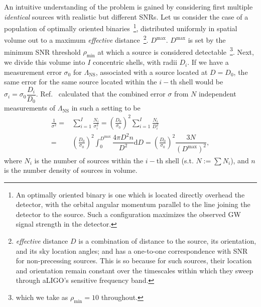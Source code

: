 \documentclass[aps,prd,amsmath,floats,floatfix, twocolumn,
superscriptaddress,nofootinbib,showpacs]{revtex4-1}
\newcommand{\prayush}{\textcolor{red!40!black}}
\newcommand{\D}{\mathrm{d}}
\newcommand{\lambdans}{\Lambda_\mathrm{NS}}
\newcommand{\deff}{D_\mathrm{eff}}
\begin{document}
% 
An intuitive understanding of the problem is gained by considering first
multiple {\it identical} sources with realistic but different SNRs. Let us consider the case
of a population of optimally oriented binaries~\footnote{An optimally oriented
binary is one which is located directly overhead the detector, with the 
orbital angular momentum parallel to the line joining the detector to the
source. Such a configuration maximizes the observed GW signal strength in 
the detector.}, distributed uniformly in spatial volume out
to a maximum {\it effective} distance~\footnote{{\it effective} distance $D$ 
is a combination of distance to the source, its orientation, and its sky
location angles; and has a one-to-one correspondence with SNR for non-precessing
sources. This is so because for such sources, their location and orientation
remain constant over the timescales within which they sweep through
aLIGO's sensitive frequency band.}.
$D^\mathrm{max}$. $D^\mathrm{max}$ is set by the minimum SNR 
threshold $\rho_\mathrm{min}$ at which a source is considered
detectable~\footnote{which
we take as $\rho_\mathrm{min}=10$ throughout.}. Next, we divide this volume into $I$
concentric shells, with radii $D_i$. If we have a measurement error
$\sigma_0$ for $\lambdans$, associated with a source located at $D=D_0$,
the same error for the same source located within the $i-$th shell would
be $\sigma_i=\sigma_0 \dfrac{D_i}{D_0}$. Ref.~\cite{Markakis:2010mp}
calculated that the combined error $\sigma$ from $N$ independent
measurements of $\lambdans$ in such a setting to be
% 
\begin{align}\label{eq:1oversigma}
\frac{1}{\sigma^2} =& \sum_{i=1}^I \frac{N_i}{\sigma_i^2} = \left(\frac{D_0}{\sigma_0}\right)^2 \sum_{i=1}^I\frac{N_i}{D_i^2}\\ \nonumber =& \left(\frac{D_0}{\sigma_0}\right)^2 \int_0^{D^\mathrm{max}} \dfrac{4\pi D^2 n}{D^2}\D D = \left(\frac{D_0}{\sigma_0}\right)^2 \dfrac{3N}{(D^\mathrm{max})^2},
\end{align}
% 
where $N_i$ is the number of sources within the $i-$th shell (s.t.
$N:=\sum N_i$), and $n$ is the number density of sources in volume.
% 
% 
% 
% 
% 
\end{document}
